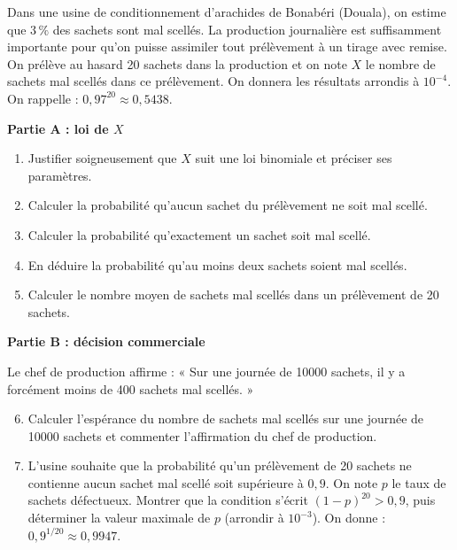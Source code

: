 \documentclass[11pt]{article}
\begin{document}
\begin{exercice}
Dans une usine de conditionnement d'arachides de Bonabéri (Douala), on estime que $3\,\%$ des sachets sont mal scellés. La production journalière est suffisamment importante pour qu'on puisse assimiler tout prélèvement à un tirage avec remise. On prélève au hasard 20 sachets dans la production et on note $X$ le nombre de sachets mal scellés dans ce prélèvement. On donnera les résultats arrondis à $10^{-4}$. On rappelle : $0{,}97^{20}\approx 0{,}5438$.

\textbf{Partie A : loi de $X$}
\begin{enumerate}
\item Justifier soigneusement que $X$ suit une loi binomiale et préciser ses paramètres.
\item Calculer la probabilité qu'aucun sachet du prélèvement ne soit mal scellé.
\item Calculer la probabilité qu'exactement un sachet soit mal scellé.
\item En déduire la probabilité qu'au moins deux sachets soient mal scellés.
\item Calculer le nombre moyen de sachets mal scellés dans un prélèvement de 20 sachets.
\end{enumerate}

\textbf{Partie B : décision commerciale}

Le chef de production affirme : « Sur une journée de \num{10000} sachets, il y a forcément moins de 400 sachets mal scellés. »
\begin{enumerate}
\setcounter{enumi}{5}
\item Calculer l'espérance du nombre de sachets mal scellés sur une journée de \num{10000} sachets et commenter l'affirmation du chef de production.
\item L'usine souhaite que la probabilité qu'un prélèvement de 20 sachets ne contienne aucun sachet mal scellé soit supérieure à $0{,}9$. On note $p$ le taux de sachets défectueux. Montrer que la condition s'écrit $(1-p)^{20}>0{,}9$, puis déterminer la valeur maximale de $p$ (arrondir à $10^{-3}$). On donne : $0{,}9^{1/20}\approx 0{,}9947$.
\end{enumerate}
\end{exercice}
\end{document}
